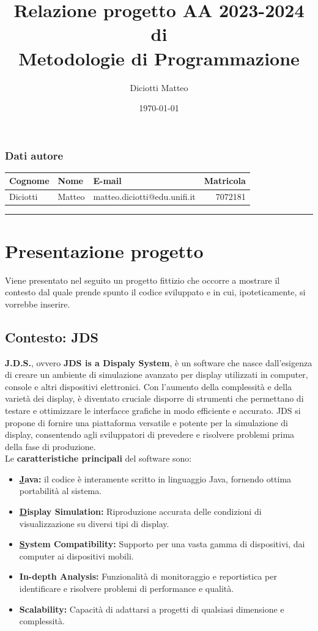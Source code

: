\documentclass[a4paper,11pt]{article}
\author{Diciotti Matteo}
\title{Relazione progetto AA 2023-2024 di\\ \textbf{Metodologie di Programmazione}}
\date{\today}
\begin{document}
	
	\maketitle
	\vspace{1em}
	\subsubsection*{Dati autore}
	\begin{tabularx}{\textwidth}{l l >{\raggedleft\arraybackslash}X r}
		\textbf{Cognome} & \textbf{Nome} & \textbf{E-mail} & \textbf{Matricola}\\\toprule
		Diciotti & Matteo & matteo.diciotti@edu.unifi.it & 7072181
	\end{tabularx}
	\vspace{6em}
	\tableofcontents
	\vspace{1em}\noindent\rule{\textwidth}{2pt}
	
	\newpage
	\section{Presentazione progetto}
	Viene presentato nel seguito un progetto fittizio che occorre a mostrare il contesto dal quale prende spunto il codice sviluppato e in cui, ipoteticamente, si vorrebbe inserire.
	\subsection{Contesto: JDS} \label{jds}
	\textbf{J.D.S.}, ovvero \textbf{JDS is a Dispaly System}, è un software che nasce dall’esigenza di creare un ambiente di simulazione avanzato per display utilizzati in computer, console e altri dispositivi elettronici. Con l’aumento della complessità e della varietà dei display, è diventato cruciale disporre di strumenti che permettano di testare e ottimizzare le interfacce grafiche in modo efficiente e accurato. JDS si propone di fornire una piattaforma versatile e potente per la simulazione di display, consentendo agli sviluppatori di prevedere e risolvere problemi prima della fase di produzione.\\
	Le \textbf{caratteristiche principali} del software sono:
	\begin{itemize}\setlength\itemsep{-3pt}		
		\item \textbf{\underline{J}ava:} il codice è interamente scritto in linguaggio Java, fornendo ottima portabilità al sistema.
		\item \textbf{\underline{D}isplay Simulation:} Riproduzione accurata delle condizioni di visualizzazione su diversi tipi di display.
		\item \textbf{\underline{S}ystem Compatibility:} Supporto per una vasta gamma di dispositivi, dai computer ai dispositivi mobili.
		\item \textbf{In-depth Analysis:} Funzionalità di monitoraggio e reportistica per identificare e risolvere problemi di performance e qualità.
		\item \textbf{Scalability:} Capacità di adattarsi a progetti di qualsiasi dimensione e complessità.
	\end{itemize}	
\end{document}
